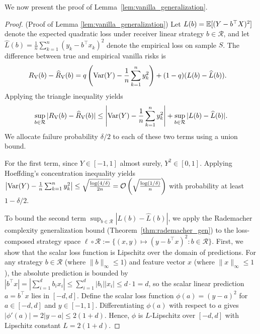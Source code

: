 We now present the proof of Lemma~\ref{lem:vanilla_generalization}.

\begin{proof}(Proof of Lemma \ref{lem:vanilla_generalization})\label{proof:vanilla_generalization}\label{app:proof_vanilla_generalization}
Let $L(b) = \mathbb{E}[(Y - b^\top X)^2]$ denote the expected quadratic loss under receiver linear strategy $b \in \mathcal{R}$, and let $\widehat{L}(b) = \frac{1}{n}\sum_{k=1}^n (y_k - b^\top x_k)^2$ denote the empirical loss on sample $S$. The difference between true and empirical vanilla risks is
\begin{align*}
    R_{\mathrm{V}}(b) - \widehat{R}_{\mathrm{V}}(b) &= q\left( \mathrm{Var}(Y) - \frac{1}{n}\sum_{k=1}^n y_k^2 \right) + (1 - q)(L(b) - \widehat{L}(b)).
\end{align*}
Applying the triangle inequality yields
\begin{equation*}
    \sup_{b \in \mathcal{R}} |R_{\mathrm{V}}(b) - \widehat{R}_{\mathrm{V}}(b)| \le \left| \mathrm{Var}(Y) - \frac{1}{n}\sum_{k=1}^n y_k^2 \right| + \sup_{b \in \mathcal{R}} |L(b) - \widehat{L}(b)|.
\end{equation*}
We allocate failure probability $\delta/2$ to each of these two terms using a union bound.

For the first term, since $Y \in [-1, 1]$ almost surely, $Y^2 \in [0, 1]$. Applying Hoeffding's concentration inequality yields $\left| \mathrm{Var}(Y) - \frac{1}{n}\sum_{k=1}^n y_k^2 \right| \le \sqrt{\frac{\log(4/\delta)}{2n}} = \mathcal{O}\left( \sqrt{\frac{\log(1/\delta)}{n}} \right)$ with probability at least $1 - \delta/2$.

To bound the second term $\sup_{b \in \mathcal{R}} |L(b) - \widehat{L}(b)|$, we apply the Rademacher complexity generalization bound (Theorem~\ref{thm:rademacher_gen}) to the loss-composed strategy space $\ell \circ \mathcal{R} := \{ (x,y) \mapsto (y - b^\top x)^2 : b \in \mathcal{R} \}$. First, we show that the scalar loss function is Lipschitz over the domain of predictions. For any strategy $b \in \mathcal{R}$ (where $\|b\|_\infty \le 1$) and feature vector $x$ (where $\|x\|_\infty \le 1$), the absolute prediction is bounded by $|b^\top x| = |\sum_{i=1}^d b_i x_i| \le \sum_{i=1}^d |b_i||x_i| \le d \cdot 1 = d$, so the scalar linear prediction $a = b^\top x$ lies in $[-d, d]$. Define the scalar loss function $\phi(a) = (y - a)^2$ for $a \in [-d, d]$ and $y \in [-1, 1]$. Differentiating $\phi(a)$ with respect to $a$ gives $|\phi'(a)| = 2|y - a| \le 2(1 + d)$. Hence, $\phi$ is $L$-Lipschitz over $[-d, d]$ with Lipschitz constant $L = 2(1 + d)$.


\end{proof}

